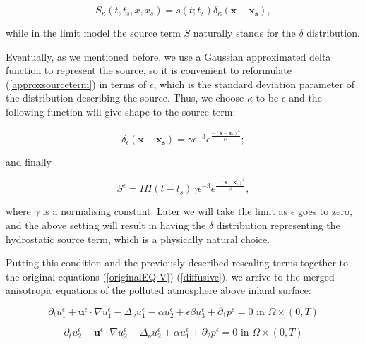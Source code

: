 \documentclass[11pt]{article}
\begin{document}
\begin{equation} \label{approxsourceterm}
  S_\kappa (t, t_s, x, x_s) = s(t; t_s) \delta_\kappa (\mathbf{x} - \mathbf{x_s}),
\end{equation}

while in the limit model the source term $S$ naturally stands for the $\delta$ distribution.
    
Eventually, as we mentioned before, we use a Gaussian approximated delta function to represent the source, so it is convenient to reformulate (\ref{approxsourceterm}) in terms of $\epsilon$, which is the standard deviation parameter of the distribution describing the source. Thus, we choose $\kappa$ to be $\epsilon$ and the following function will give shape to the source term:

\[\delta_\epsilon (\mathbf{x}-\mathbf{x_s}) = \gamma \epsilon^{-3} e ^ {\frac{-(\mathbf{x}-\mathbf{x_s})^2}{\epsilon^2}};\]

and finally

\begin{equation} \label{sourcedefinition}
  S^\epsilon = I H(t-t_s) \gamma \epsilon^{-3} e ^ {\frac{-(\mathbf{x}-\mathbf{x_s})^2}{\epsilon^2}},
\end{equation}

where $\gamma$ is a normalising constant. Later we will take the limit as $\epsilon$ goes to zero, and the above setting will result in having the $\delta$ distribution representing the hydrostatic source term, which is a physically natural choice.
    
    Putting this condition and the previously described rescaling terms together to the original equations (\ref{originalEQ-V})-(\ref{diffusive}), we arrive to the merged anisotropic equations of the polluted atmosphere above inland surface:
  
    \begin{equation} \label{ANSC1}
    \partial_t u^\epsilon _1 + \mathbf{u}^\epsilon \cdot \nabla u^\epsilon _1 -\Delta_\nu u^\epsilon _1 -\alpha u_2^\epsilon + \epsilon \beta u_3^\epsilon + \partial_1 p^\epsilon = 0 \text{ in } \Omega \times (0,T)
    \end{equation}
    
    \begin{equation} \label{ANSC2}
    \partial_t u_2^\epsilon + \mathbf{u}^\epsilon \cdot \nabla u_2^\epsilon -\Delta_\nu u_2^\epsilon + \alpha u_1^\epsilon + \partial_2 p^\epsilon = 0 \text{ in } \Omega \times (0,T)
    \end{equation}
    
\end{document}
